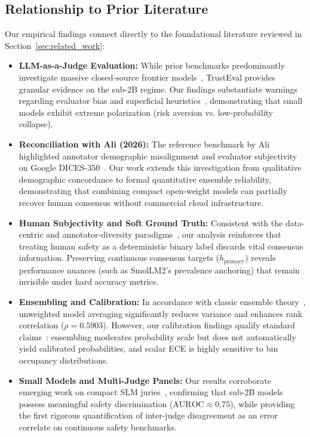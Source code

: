 \subsection{Relationship to Prior Literature}
\label{subsec:disc_relationship_prior_work}

Our empirical findings connect directly to the foundational literature reviewed in Section~\ref{sec:related_work}:
\begin{itemize}
    \item \textbf{LLM-as-a-Judge Evaluation:} While prior benchmarks predominantly investigate massive closed-source frontier models~\cite{zheng2023judging,wang2023pandalm,tan2025judgebench,bavaresco2025llms}, TrustEval provides granular evidence on the sub-2B regime. Our findings substantiate warnings regarding evaluator bias and superficial heuristics~\cite{debenedetti2024evading}, demonstrating that small models exhibit extreme polarization (risk aversion vs. low-probability collapse).
    \item \textbf{Reconciliation with Ali (2026):} The reference benchmark by Ali~\cite{ali2026whose} highlighted annotator demographic misalignment and evaluator subjectivity on Google DICES-350~\cite{aroyo2023dices}. Our work extends this investigation from qualitative demographic concordance to formal quantitative ensemble reliability, demonstrating that combining compact open-weight models can partially recover human consensus without commercial cloud infrastructure.
    \item \textbf{Human Subjectivity and Soft Ground Truth:} Consistent with the data-centric and annotator-diversity paradigms~\cite{basile2021we,gordon2021disagreement,gordon2022jury,davani2022dealing,rottger2022two}, our analysis reinforces that treating human safety as a deterministic binary label discards vital consensus information. Preserving continuous consensus targets ($h_{\text{primary}}$) reveals performance nuances (such as SmolLM2's prevalence anchoring) that remain invisible under hard accuracy metrics.
    \item \textbf{Ensembling and Calibration:} In accordance with classic ensemble theory~\cite{lakshminarayanan2017simple,ovadia2019can}, unweighted model averaging significantly reduces variance and enhances rank correlation ($\rho=0.5903$). However, our calibration findings qualify standard claims~\cite{guo2017calibration}: ensembling moderates probability scale but does not automatically yield calibrated probabilities, and scalar ECE is highly sensitive to bin occupancy distributions.
    \item \textbf{Small Models and Multi-Judge Panels:} Our results corroborate emerging work on compact SLM juries~\cite{laddha2026slmjury,zhang2026can,schwinn2026coin}, confirming that sub-2B models possess meaningful safety discrimination ($\text{AUROC} \approx 0.75$), while providing the first rigorous quantification of inter-judge disagreement as an error correlate on continuous safety benchmarks.
\end{itemize}
